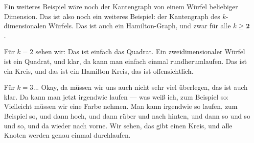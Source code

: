 \begin{spoken-clean}[00:37:58 - 00:39:52]
Ein weiteres Beispiel wäre noch der Kantengraph von einem Würfel beliebiger Dimension. Das ist also noch ein weiteres Beispiel: der Kantengraph des $k$-dimensionalen Würfels. Das ist auch ein Hamilton-Graph, und zwar für alle $k \ge \textbf{2}$.

Für $k = 2$ sehen wir: Das ist einfach das Quadrat. Ein zweidimensionaler Würfel ist ein Quadrat, und klar, da kann man einfach einmal rundherumlaufen. Das ist ein Kreis, und das ist ein Hamilton-Kreis, das ist offensichtlich.

Für $k = 3$... Okay, da müssen wir uns auch nicht sehr viel überlegen, das ist auch klar. Da kann man jetzt irgendwie laufen --- was weiß ich, zum Beispiel so: Vielleicht müssen wir eine Farbe nehmen. Man kann irgendwie so laufen, zum Beispiel so, und dann hoch, und dann rüber und nach hinten, und dann so und so und so, und da wieder nach vorne. Wir sehen, das gibt einen Kreis, und alle Knoten werden genau einmal durchlaufen.
\end{spoken-clean}

